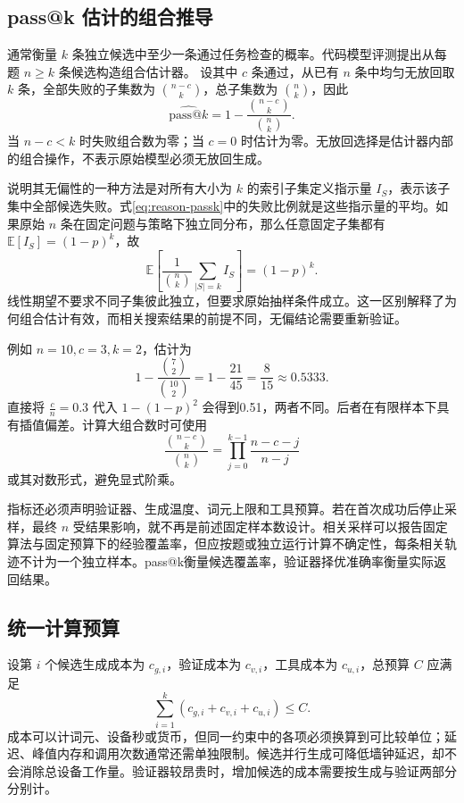 \documentclass[../textbook.tex]{subfiles}
\begin{document}
\subsection{pass@k 估计的组合推导}
通常衡量 $k$ 条独立候选中至少一条通过任务检查的概率。代码模型评测提出从每题 $n\geq k$ 条候选构造组合估计器。\cite{chen2021codeeval} 设其中 $c$ 条通过，从已有 $n$ 条中均匀无放回取 $k$ 条，全部失败的子集数为 $\binom{n-c}{k}$，总子集数为 $\binom nk$，因此
\begin{equation}
 \widehat{\mathrm{pass@}k}=1-\frac{\binom{n-c}{k}}{\binom nk}.
 \label{eq:reason-passk}
\end{equation}
当 $n-c<k$ 时失败组合数为零；当 $c=0$ 时估计为零。无放回选择是估计器内部的组合操作，不表示原始模型必须无放回生成。

说明其无偏性的一种方法是对所有大小为 $k$ 的索引子集定义指示量 $I_S$，表示该子集中全部候选失败。式\eqref{eq:reason-passk}中的失败比例就是这些指示量的平均。如果原始 $n$ 条在固定问题与策略下独立同分布，那么任意固定子集都有 $\mathbb E[I_S]=(1-p)^k$，故
\begin{equation}
 \mathbb E\left[\frac{1}{\binom nk}\sum_{|S|=k}I_S\right]=(1-p)^k.
\end{equation}
线性期望不要求不同子集彼此独立，但要求原始抽样条件成立。这一区别解释了为何组合估计有效，而相关搜索结果的前提不同，无偏结论需要重新验证。

例如 $n=10,c=3,k=2$，估计为
\begin{equation}
 1-\frac{\binom72}{\binom{10}2}=1-\frac{21}{45}=\frac8{15}\approx0.5333.
\end{equation}
直接将 $\frac{c}{n}=0.3$ 代入 $1-(1-p)^2$ 会得到0.51，两者不同。后者在有限样本下具有插值偏差。计算大组合数时可使用
\begin{equation}
 \frac{\binom{n-c}{k}}{\binom nk}
 =\prod_{j=0}^{k-1}\frac{n-c-j}{n-j}
\end{equation}
或其对数形式，避免显式阶乘。

指标还必须声明验证器、生成温度、词元上限和工具预算。若在首次成功后停止采样，最终 $n$ 受结果影响，就不再是前述固定样本数设计。相关采样可以报告固定算法与固定预算下的经验覆盖率，但应按题或独立运行计算不确定性，每条相关轨迹不计为一个独立样本。pass@k衡量候选覆盖率，验证器择优准确率衡量实际返回结果。

\subsection{统一计算预算}
设第 $i$ 个候选生成成本为 $c_{g,i}$，验证成本为 $c_{v,i}$，工具成本为 $c_{u,i}$，总预算 $C$ 应满足
\begin{equation}
 \sum_{i=1}^{k}(c_{g,i}+c_{v,i}+c_{u,i})\leq C.
\end{equation}
成本可以计词元、设备秒或货币，但同一约束中的各项必须换算到可比较单位；延迟、峰值内存和调用次数通常还需单独限制。候选并行生成可降低墙钟延迟，却不会消除总设备工作量。验证器较昂贵时，增加候选的成本需要按生成与验证两部分分别计。
\end{document}
